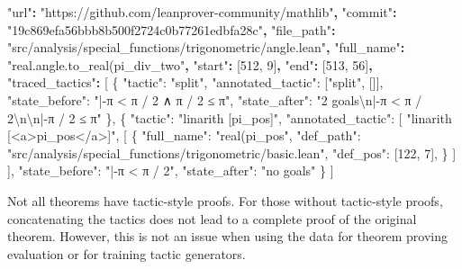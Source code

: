 \documentclass[
]{article}
\newenvironment{Shaded}{}{}
\newcommand{\CharTok}[1]{\textcolor[rgb]{0.25,0.44,0.63}{#1}}
\newcommand{\DataTypeTok}[1]{\textcolor[rgb]{0.56,0.13,0.00}{#1}}
\newcommand{\DecValTok}[1]{\textcolor[rgb]{0.25,0.63,0.44}{#1}}
\newcommand{\ErrorTok}[1]{\textcolor[rgb]{1.00,0.00,0.00}{\textbf{#1}}}
\newcommand{\FunctionTok}[1]{\textcolor[rgb]{0.02,0.16,0.49}{#1}}
\newcommand{\OtherTok}[1]{\textcolor[rgb]{0.00,0.44,0.13}{#1}}
\newcommand{\StringTok}[1]{\textcolor[rgb]{0.25,0.44,0.63}{#1}}
\begin{document}
\begin{Shaded}
\begin{Highlighting}[]
\StringTok{"url"}\ErrorTok{:} \StringTok{"https://github.com/leanprover{-}community/mathlib"}\ErrorTok{,}
\StringTok{"commit"}\ErrorTok{:} \StringTok{"19c869efa56bbb8b500f2724c0b77261edbfa28c"}\ErrorTok{,}
\StringTok{"file\_path"}\ErrorTok{:} \StringTok{"src/analysis/special\_functions/trigonometric/angle.lean"}\ErrorTok{,}
\StringTok{"full\_name"}\ErrorTok{:} \StringTok{"real.angle.to\_real(pi\_div\_two"}\ErrorTok{,}
\StringTok{"start"}\ErrorTok{:} \OtherTok{[}\DecValTok{512}\OtherTok{,} \DecValTok{9}\OtherTok{]}\ErrorTok{,}
\StringTok{"end"}\ErrorTok{:} \OtherTok{[}\DecValTok{513}\OtherTok{,} \DecValTok{56}\OtherTok{]}\ErrorTok{,}
\StringTok{"traced\_tactics"}\ErrorTok{:} \OtherTok{[}
    \FunctionTok{\{}
    \DataTypeTok{"tactic"}\FunctionTok{:} \StringTok{"split"}\FunctionTok{,}
    \DataTypeTok{"annotated\_tactic"}\FunctionTok{:} \OtherTok{[}\StringTok{"split"}\OtherTok{,} \OtherTok{[]]}\FunctionTok{,}
    \DataTypeTok{"state\_before"}\FunctionTok{:} \StringTok{"|{-}π \textless{} π / 2 ∧ π / 2 ≤ π"}\FunctionTok{,}
    \DataTypeTok{"state\_after"}\FunctionTok{:} \StringTok{"2 goals}\CharTok{\textbackslash{}n}\StringTok{|{-}π \textless{} π / 2}\CharTok{\textbackslash{}n\textbackslash{}n}\StringTok{|{-}π / 2 ≤ π"}
    \FunctionTok{\}}\OtherTok{,}
    \FunctionTok{\{}
    \DataTypeTok{"tactic"}\FunctionTok{:} \StringTok{"linarith [pi\_pos]"}\FunctionTok{,}
    \DataTypeTok{"annotated\_tactic"}\FunctionTok{:} \OtherTok{[}
    \StringTok{"linarith [\textless{}a\textgreater{}pi\_pos\textless{}/a\textgreater{}]"}\OtherTok{,} \OtherTok{[}
    \FunctionTok{\{}
    \DataTypeTok{"full\_name"}\FunctionTok{:} \StringTok{"real(pi\_pos"}\FunctionTok{,}
    \DataTypeTok{"def\_path"}\FunctionTok{:} \StringTok{"src/analysis/special\_functions/trigonometric/basic.lean"}\FunctionTok{,}
    \DataTypeTok{"def\_pos"}\FunctionTok{:} \OtherTok{[}\DecValTok{122}\OtherTok{,} \DecValTok{7}\OtherTok{]}\FunctionTok{,}
    \FunctionTok{\}}
    \OtherTok{]}
    \OtherTok{]}\FunctionTok{,}
    \DataTypeTok{"state\_before"}\FunctionTok{:} \StringTok{"|{-}π \textless{} π / 2"}\FunctionTok{,}
    \DataTypeTok{"state\_after"}\FunctionTok{:} \StringTok{"no goals"}
    \FunctionTok{\}}
\OtherTok{]} 
\end{Highlighting}
\end{Shaded}

Not all theorems have tactic-style proofs. For those without
tactic-style proofs, concatenating the tactics does not lead to a
complete proof of the original theorem. However, this is not an issue
when using the data for theorem proving evaluation or for training
tactic generators.
\end{document}

